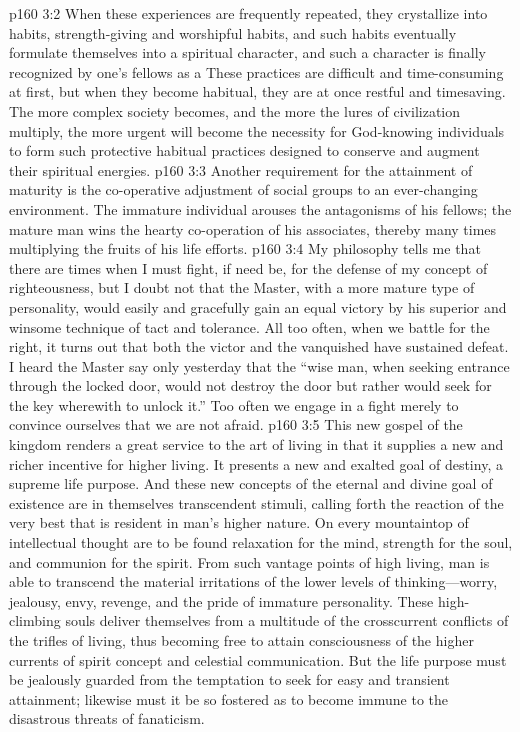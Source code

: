 \vs p160 3:2 When these experiences are frequently repeated, they crystallize into habits, strength\hyp{}giving and worshipful habits, and such habits eventually formulate themselves into a spiritual character, and such a character is finally recognized by one’s fellows as a  These practices are difficult and time\hyp{}consuming at first, but when they become habitual, they are at once restful and timesaving. The more complex society becomes, and the more the lures of civilization multiply, the more urgent will become the necessity for God\hyp{}knowing individuals to form such protective habitual practices designed to conserve and augment their spiritual energies.
\vs p160 3:3 Another requirement for the attainment of maturity is the co\hyp{}operative adjustment of social groups to an ever\hyp{}changing environment. The immature individual arouses the antagonisms of his fellows; the mature man wins the hearty co\hyp{}operation of his associates, thereby many times multiplying the fruits of his life efforts.
\vs p160 3:4 My philosophy tells me that there are times when I must fight, if need be, for the defense of my concept of righteousness, but I doubt not that the Master, with a more mature type of personality, would easily and gracefully gain an equal victory by his superior and winsome technique of tact and tolerance. All too often, when we battle for the right, it turns out that both the victor and the vanquished have sustained defeat. I heard the Master say only yesterday that the \textcolor{ubdarkred}{“wise man, when seeking entrance through the locked door, would not destroy the door but rather would seek for the key wherewith to unlock it.”} Too often we engage in a fight merely to convince ourselves that we are not afraid.
\vs p160 3:5 This new gospel of the kingdom renders a great service to the art of living in that it supplies a new and richer incentive for higher living. It presents a new and exalted goal of destiny, a supreme life purpose. And these new concepts of the eternal and divine goal of existence are in themselves transcendent stimuli, calling forth the reaction of the very best that is resident in man’s higher nature. On every mountaintop of intellectual thought are to be found relaxation for the mind, strength for the soul, and communion for the spirit. From such vantage points of high living, man is able to transcend the material irritations of the lower levels of thinking---worry, jealousy, envy, revenge, and the pride of immature personality. These high\hyp{}climbing souls deliver themselves from a multitude of the crosscurrent conflicts of the trifles of living, thus becoming free to attain consciousness of the higher currents of spirit concept and celestial communication. But the life purpose must be jealously guarded from the temptation to seek for easy and transient attainment; likewise must it be so fostered as to become immune to the disastrous threats of fanaticism.\plusone
